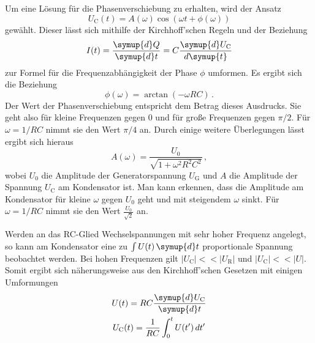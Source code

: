 Um eine Lösung für die Phasenverschiebung zu erhalten, wird der Ansatz
\begin{equation}
  U_{\text{C}}(t)=A(\omega)\cos(\omega t + \phi(\omega))
\end{equation}
gewählt. Dieser lässt sich mithilfe der Kirchhoff'schen Regeln und der Beziehung
\begin{equation}
  I(t)=\frac{\symup{d}Q}{\symup{d}t}=C\frac{\symup{d}U_{\text{C}}}{d\symup{t}}
\end{equation}
zur Formel für die Frequenzabhängigkeit der Phase $\phi$ umformen. Es ergibt sich die
Beziehung
\begin{equation}
  \phi(\omega)=\arctan(-\omega R C) \,.
  \label{eqn:phasenfrequenz}
\end{equation}
Der Wert der Phasenverschiebung entspricht dem Betrag dieses Ausdrucks. Sie geht
also für kleine Frequenzen gegen $0$ und für große Frequenzen gegen $\pi/2$.
Für $\omega=1/RC$ nimmt sie den Wert $\pi/4$ an.
Durch einige weitere Überlegungen lässt ergibt sich hieraus
\begin{equation}
  A(\omega)=\frac{U_{\text{0}}}{\sqrt{1+\omega^2 R^2 C^2}} \,,
  \label{eqn:kondensatorfrequenz}
\end{equation}
wobei $U_{\text{0}}$ die Amplitude der Generatorspannung $U_{\text{G}}$ und $A$ die
Amplitude der Spannung $U_{\text{C}}$ am Kondensator ist.
Man kann erkennen, dass die Amplitude am Kondensator für kleine $\omega$ gegen $U_{\text{0}}$ geht
und mit steigendem $\omega$ sinkt. Für $\omega=1/RC$ nimmt sie den Wert
$\frac{U_{\text{0}}}{\sqrt{2}}$ an.

Werden an das RC-Glied Wechselspannungen mit sehr hoher Frequenz angelegt, so kann
am Kondensator eine zu $\int U(t)\,\symup{d}t$ proportionale Spannung beobachtet werden.
Bei hohen Frequenzen gilt $\lvert U_{\text{C}} \rvert << \lvert U_{\text{R}} \rvert$
und $\lvert U_{\text{C}} \rvert << \lvert U \rvert$. Somit ergibt sich näherungsweise
aus den Kirchhoff'schen Gesetzen mit einigen Umformungen
\begin{gather}
  U(t)= R C \frac{\symup{d}U_{\text{C}}}{\symup{d}t} \\
  U_{\text{C}}(t)=\frac{1}{RC}\int_0^t U(t')\, dt'
\end{gather}



\label{sec:Theorie}
